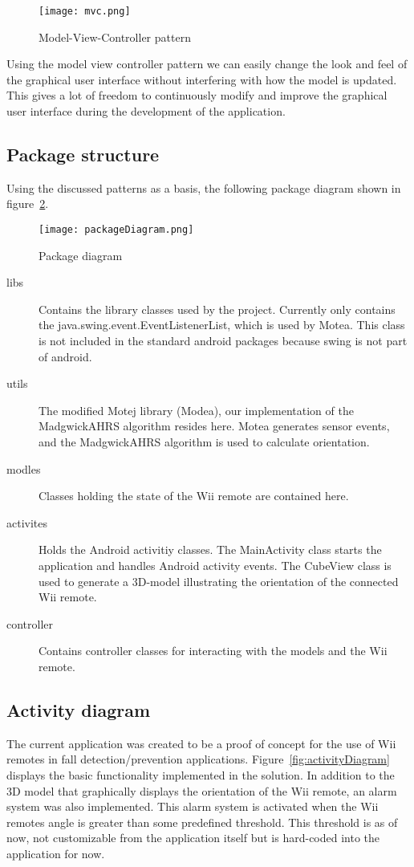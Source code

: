 \begin{figure}[h!]
  \centering
    \texttt{[image: mvc.png]}
    \caption{\footnotesize Model-View-Controller pattern}
    \label{fig:mvc}
\end{figure}

Using the model view controller pattern we can easily change the look and feel of the graphical user interface without interfering with how the model is updated. This gives a lot of freedom to continuously modify and improve the graphical user interface during the development of the application. 

\subsection{Package structure}
Using the discussed patterns as a basis, the following package diagram shown in figure~\ref{fig:packageDiagram}. 

\begin{figure}[h!]
  \centering
    \texttt{[image: packageDiagram.png]}
    \caption{\footnotesize Package diagram}
    \label{fig:packageDiagram}
\end{figure}

\begin{description}
	\item[libs] Contains the library classes used by the project. Currently only contains the java.swing.event.EventListenerList, which is used by Motea. This class is not included in the standard android packages because swing is not part of android.
	\item[utils] The modified Motej library (Modea), our implementation of the MadgwickAHRS algorithm resides here. Motea generates sensor events, and the MadgwickAHRS algorithm is used to calculate orientation.
	\item[modles] Classes holding the state of the Wii remote are contained here.
	\item[activites] Holds the Android activitiy classes. The MainActivity class starts the application and handles Android activity events. The CubeView class is used to generate a 3D-model illustrating the orientation of the connected Wii remote.
	\item[controller] Contains controller classes for interacting with the models and the Wii remote.
\end{description}

\subsection{Activity diagram}
The current application was created to be a proof of concept for the use of Wii remotes in fall detection/prevention applications. Figure~\ref{fig:activityDiagram} displays the basic functionality implemented in the solution. In addition to the 3D model that graphically displays the orientation of the Wii remote, an alarm system was also implemented. This alarm system is activated when the Wii remotes angle is greater than some predefined threshold. This threshold is as of now, not customizable from the application itself but is hard-coded  into the application for now. 

